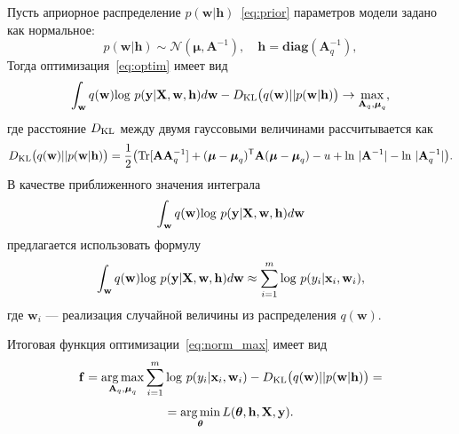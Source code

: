 Пусть априорное распределение $p(\mathbf{w}|\mathbf{h})$~\eqref{eq:prior} параметров модели задано как нормальное:
\[
	p(\mathbf{w}|\mathbf{h}) \sim \mathcal{N}(\boldsymbol{\mu}, \mathbf{A}^{-1}),\quad \mathbf{h} = \textbf{diag}(\mathbf{A}^{-1}_q),
\] 
Тогда оптимизация~\eqref{eq:optim} имеет вид
\begin{equation}
\label{eq:norm_max}
 \int_{\mathbf{w}} q(\mathbf{w})\textnormal{log}~{p(\mathbf{y}|\mathbf{X},\mathbf{w},\mathbf{h})} d \mathbf{w} - D_\textnormal{KL}\bigl(q (\mathbf{w} )|| p (\mathbf{w}|\mathbf{h})\bigr) \to \max_{\mathbf{A}_q, \boldsymbol{\mu}_q},
\end{equation}
где расстояние $D_\textnormal{KL}$ между двумя гауссовыми величинами рассчитывается как 
\[
	D_\textnormal{KL}\bigl(q (\mathbf{w}) || p (\mathbf{w}|\mathbf{h})\bigr) = \frac{1}{2} \bigl( \textnormal{Tr} [\mathbf{A}\mathbf{A}^{-1}_q] + (\boldsymbol{\mu} - \boldsymbol{\mu}_q)^\mathsf{T}\mathbf{A}(\boldsymbol{\mu} - \boldsymbol{\mu}_q) - u +\textnormal{ln}~|\mathbf{A}^{-1}| - \textnormal{ln}~|\mathbf{A}_q^{-1}| \bigr).
\]
В качестве приближенного значения интеграла $$\int_{\mathbf{w}} q(\mathbf{w})\textnormal{log}~{p(\mathbf{y}|\mathbf{X},\mathbf{w},\mathbf{h})} d \mathbf{w}$$ предлагается использовать формулу
\[
\int_{\mathbf{w}} q(\mathbf{w})\textnormal{log}~{p(\mathbf{y}|\mathbf{X},\mathbf{w},\mathbf{h})} d \mathbf{w} \approx \sum_{i=1}^m \textnormal{log}~p({y}_i|\mathbf{x}_i, \mathbf{w}_i),
\]
где $\mathbf{w}_i$  --- реализация случайной величины из распределения $q(\mathbf{w})$.

Итоговая функция оптимизации~\eqref{eq:norm_max} имеет вид
\begin{equation}
\label{eq:gaus}
	\mathbf{f} = \operatorname*{arg\,max}_{\mathbf{A}_q, \boldsymbol{\mu}_q} \sum_{i=1}^m \textnormal{log}~p({y}_i|\mathbf{x}_i, \mathbf{w}_i) - D_\textnormal{KL}\bigl(q (\mathbf{w} )|| p (\mathbf{w}|\mathbf{h})\bigr) =
\end{equation}
\[
   = \operatorname*{arg\,min}_{\boldsymbol{\theta}} L( \boldsymbol{\theta}, \mathbf{h}, \mathbf{X}, \mathbf{y}).
\]

